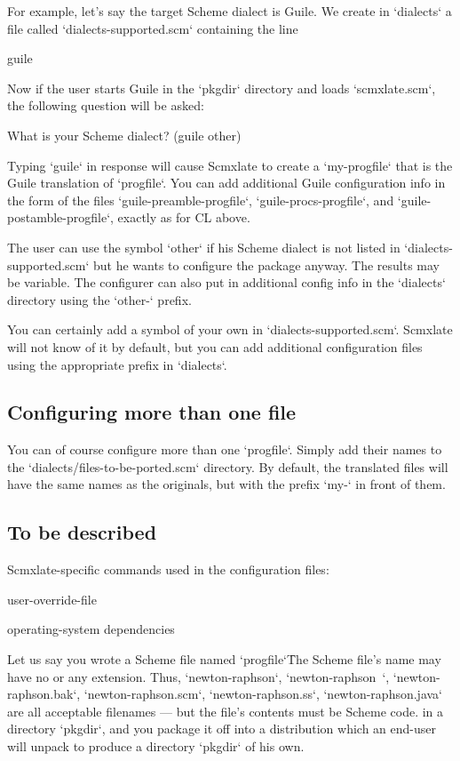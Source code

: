 For example, let’s say the target Scheme dialect
is Guile.  We create in `dialects` a file called
`dialects-supported.scm` containing the line

\begintt
guile
\endtt

Now if the user starts Guile in the `pkgdir`
directory and loads `scmxlate.scm`, the following
question will be asked:

\begintt
What is your Scheme dialect?
     (guile other)
\endtt

Typing `guile` in response will cause Scmxlate to
create a `my-progfile` that is the Guile translation
of `progfile`.  You can add additional Guile
configuration info in the form of the files
`guile-preamble-progfile`, `guile-procs-progfile`,
and `guile-postamble-progfile`, exactly as for CL
above.

The user can use the symbol `other` if his Scheme
dialect is not listed in `dialects-supported.scm` but
he wants to configure the package anyway.  The results
may be variable.  The configurer can also put in
additional config info in the `dialects`
directory using the `other-` prefix.

You can certainly add a symbol of your own in
`dialects-supported.scm`.  Scmxlate will not know
of it by default, but you can add additional
configuration files using the appropriate prefix in
`dialects`.

\subsection{Configuring more than one file}

You can of course configure more than one `progfile`.
Simply add their names to the
`dialects/files-to-be-ported.scm` directory.  By
default, the translated files will have the same names
as the originals, but with the prefix `my-` in front
of them.

\subsection{To be described}

Scmxlate-specific commands used in the
configuration files:

user-override-file

operating-system dependencies

Let us say you wrote a Scheme file named
`progfile`\f{The Scheme file’s name may have no or
any extension.  Thus, `newton-raphson`,
`newton-raphson~`, `newton-raphson.bak`,
`newton-raphson.scm`, `newton-raphson.ss`,
`newton-raphson.java` are all acceptable filenames
--- but the file’s contents must be Scheme code.} in a
directory `pkgdir`, and you package it off into a
distribution which an end-user will unpack to
produce a directory `pkgdir` of his own.

